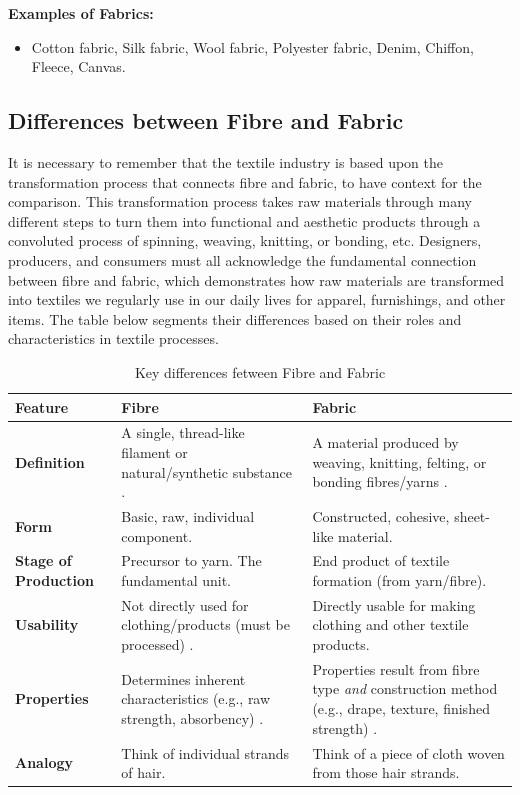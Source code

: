 \textbf{Examples of Fabrics:}
\begin{itemize}[noitemsep, topsep=0pt]
    \item Cotton fabric, Silk fabric, Wool fabric, Polyester fabric, Denim, Chiffon, Fleece, Canvas.
\end{itemize}

\subsection{Differences between Fibre and Fabric}

It is necessary to remember that the textile industry is based upon the transformation process that connects fibre and fabric, to have context for the comparison. This transformation process takes raw materials through many different steps to turn them into functional and aesthetic products through a convoluted process of spinning, weaving, knitting, or bonding, etc. Designers, producers, and consumers must all acknowledge the fundamental connection between fibre and fabric, which demonstrates how raw materials are transformed into textiles we regularly use in our daily lives for apparel, furnishings, and other items. The table below segments their differences based on their roles and characteristics in textile processes.

\newpage

\begin{table}[h!]
    \centering
    \caption{Key differences fetween Fibre and Fabric}
    \label{tab:fibre_fabric_diff}
    \begin{tabular}{l p{5cm} p{5cm}} %
        \toprule
        \textbf{Feature} & \textbf{Fibre} & \textbf{Fabric} \\
        \midrule
        \textbf{Definition} & A single, thread-like filament or natural/synthetic substance \cite{researchgate}. & A material produced by weaving, knitting, felting, or bonding fibres/yarns \cite{researchgate, hong2024research}. \\
        \textbf{Form} & Basic, raw, individual component. & Constructed, cohesive, sheet-like material. \\
        \textbf{Stage of Production} & Precursor to yarn. The fundamental unit. & End product of textile formation (from yarn/fibre). \\
        \textbf{Usability} & Not directly used for clothing/products (must be processed) \cite{researchgate}. & Directly usable for making clothing and other textile products. \\
        \textbf{Properties} & Determines inherent characteristics (e.g., raw strength, absorbency) \cite{researchgate}. & Properties result from fibre type \textit{and} construction method (e.g., drape, texture, finished strength) \cite{researchgate, hong2024research}. \\
        \textbf{Analogy} & Think of individual strands of hair. & Think of a piece of cloth woven from those hair strands. \\
        \bottomrule
    \end{tabular}
\end{table}

